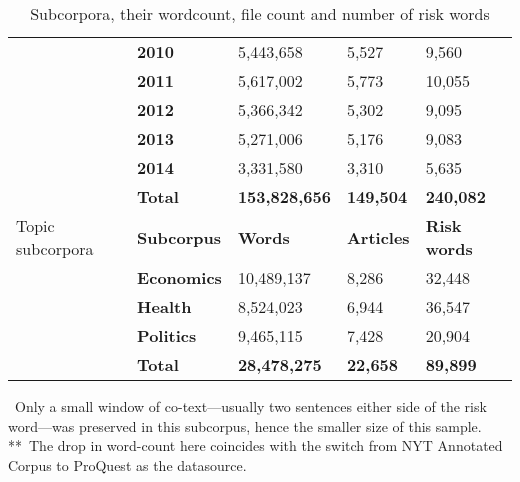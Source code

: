 \begin{table}
\begin{tabular}{p{1.5cm}|l|l|l|l|}
~ & \textbf{2010} & 5,443,658 & 5,527 &  9,560  \\ \cline{2-5}
~ & \textbf{2011} & 5,617,002 & 5,773 & 10,055  \\ \cline{2-5}
~ & \textbf{2012} & 5,366,342 & 5,302 &  9,095  \\ \cline{2-5}
~ & \textbf{2013} & 5,271,006 & 5,176 &  9,083  \\ \cline{2-5}
~ & \textbf{2014} & 3,331,580 & 3,310 &  5,635 \\ \cline{2-5}
~ & \textbf{Total} & \textbf{153,828,656} & \textbf{149,504} & \textbf{240,082} \\ \hline
\multicolumn{1}{|p{1.5cm}|}{Topic \mbox{subcorpora}} & \textbf{Subcorpus} & \textbf{Words} & \textbf{Articles} & \textbf{Risk words}   \\ \hline
~ & \textbf{Economics} & 10,489,137 & 8,286 & 32,448 \\ \cline{2-5}
~ & \textbf{Health}    & 8,524,023  & 6,944 & 36,547 \\ \cline{2-5}
~ & \textbf{Politics}  & 9,465,115  & 7,428 & 20,904 \\ \cline{2-5}
~ & \textbf{Total} & \textbf{28,478,275} & \textbf{22,658} & \textbf{89,899} \\ \cline{2-5}
\end{tabular}
    \caption{Subcorpora, their wordcount, file count and number of risk words}
    \label{tab:stats}
    \medskip %
\begin{minipage}{0.9\textwidth} %
{\footnotesize *~Only a small window of co-text---usually two sentences either side of the risk word---was preserved in this subcorpus, hence the smaller size of this sample.~\\
**~The drop in word-count here coincides with the switch from NYT Annotated Corpus to ProQuest as the datasource.\par}
\end{minipage}
\end{table}


